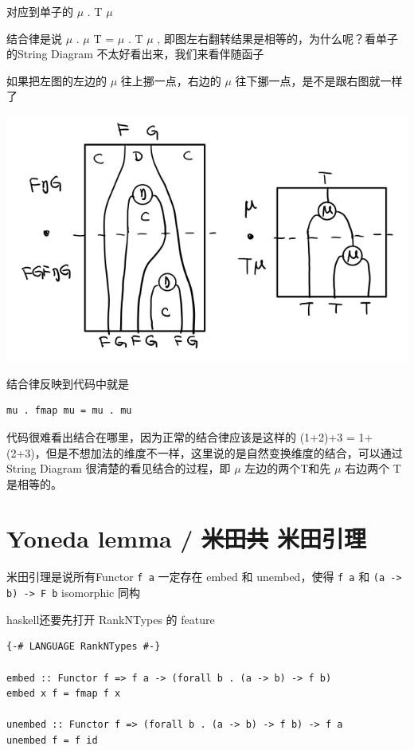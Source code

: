\documentclass[11pt]{tufte-book}
\begin{document}
对应到单子的 \(\mu\) . T \(\mu\)

结合律是说 \(\mu\) . \(\mu\) T = \(\mu\) . T \(\mu\) , 即图左右翻转结果是相等的，为什么呢？看单子的String Diagram 不太好看出来，我们来看伴随函子

如果把左图的左边的 \(\mu\) 往上挪一点，右边的 \(\mu\) 往下挪一点，是不是跟右图就一样了
\begin{center}
\includegraphics[width=.9\linewidth]{images/p1-ajunction-functor-monad-laws-4.png}
\end{center}

结合律反映到代码中就是
\begin{verbatim}
mu . fmap mu = mu . mu
\end{verbatim}

代码很难看出结合在哪里，因为正常的结合律应该是这样的 (1+2)+3 = 1+(2+3)，但是不想加法的维度不一样，这里说的是自然变换维度的结合，可以通过String Diagram 很清楚的看见结合的过程，即 \(\mu\) 左边的两个T和先 \(\mu\) 右边两个 T 是相等的。

\chapter{Yoneda lemma / \sout{米田共} 米田引理}
\label{sec:org3127f76}

米田引理是说所有Functor \texttt{f a} 一定存在 embed 和 unembed，使得 \texttt{f a} 和 \texttt{(a -> b) -> F b} isomorphic 同构

haskell还要先打开 RankNTypes 的 feature

\begin{verbatim}
{-# LANGUAGE RankNTypes #-}

embed :: Functor f => f a -> (forall b . (a -> b) -> f b)
embed x f = fmap f x

unembed :: Functor f => (forall b . (a -> b) -> f b) -> f a
unembed f = f id
\end{verbatim}
\end{document}
